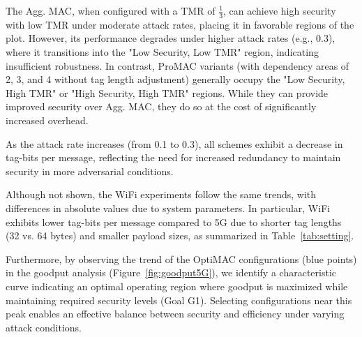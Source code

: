 The Agg. MAC, when configured with a TMR of $\frac{1}{3}$, can achieve high security with low TMR under moderate attack rates, placing it in favorable regions of the plot. However, its performance degrades under higher attack rates (e.g., 0.3), where it transitions into the "Low Security, Low TMR" region, indicating insufficient robustness. In contrast, ProMAC variants (with dependency areas of 2, 3, and 4 without tag length adjustment) generally occupy the "Low Security, High TMR" or "High Security, High TMR" regions. While they can provide improved security over Agg. MAC, they do so at the cost of significantly increased overhead.

As the attack rate increases (from 0.1 to 0.3), all schemes exhibit a decrease in tag-bits per message, reflecting the need for increased redundancy to maintain security in more adversarial conditions.

Although not shown, the WiFi experiments follow the same trends, with differences in absolute values due to system parameters. In particular, WiFi exhibits lower tag-bits per message compared to 5G due to shorter tag lengths (32 vs. 64 bytes) and smaller payload sizes, as summarized in Table~\ref{tab:setting}.

Furthermore, by observing the trend of the OptiMAC configurations (blue points) in the goodput analysis (Figure~\ref{fig:goodput5G}), we identify a characteristic curve indicating an optimal operating region where goodput is maximized while maintaining required security levels (Goal G1). Selecting configurations near this peak enables an effective balance between security and efficiency under varying attack conditions.